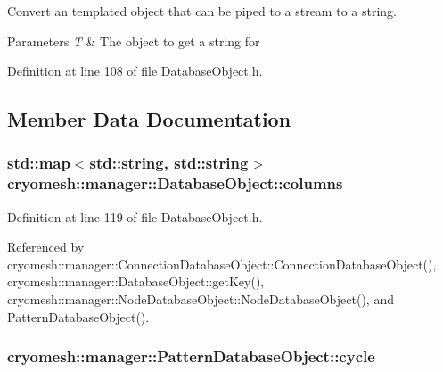 \-Convert an templated object that can be piped to a stream to a string. 


\begin{DoxyParams}{\-Parameters}
{\em \-T} & \-The object to get a string for \\
\hline
\end{DoxyParams}


\-Definition at line 108 of file \-Database\-Object.\-h.



\subsection{\-Member \-Data \-Documentation}
\hypertarget{classcryomesh_1_1manager_1_1DatabaseObject_a9c648bf09b9fd8b4d599b0d4f4abf531}{
\subsubsection[{columns}]{\setlength{\rightskip}{0pt plus 5cm}std\-::map$<$std\-::string, std\-::string$>$ {\bf cryomesh\-::manager\-::\-Database\-Object\-::columns}}}\label{classcryomesh_1_1manager_1_1DatabaseObject_a9c648bf09b9fd8b4d599b0d4f4abf531}


\-Definition at line 119 of file \-Database\-Object.\-h.



\-Referenced by cryomesh\-::manager\-::\-Connection\-Database\-Object\-::\-Connection\-Database\-Object(), cryomesh\-::manager\-::\-Database\-Object\-::get\-Key(), cryomesh\-::manager\-::\-Node\-Database\-Object\-::\-Node\-Database\-Object(), and \-Pattern\-Database\-Object().

\hypertarget{classcryomesh_1_1manager_1_1PatternDatabaseObject_aadaa9dab4b616e4780b3ca8119ba38b7}{
\subsubsection[{cycle}]{ {\bf cryomesh\-::manager\-::\-Pattern\-Database\-Object\-::cycle}}}\label{classcryomesh_1_1manager_1_1PatternDatabaseObject_aadaa9dab4b616e4780b3ca8119ba38b7}


